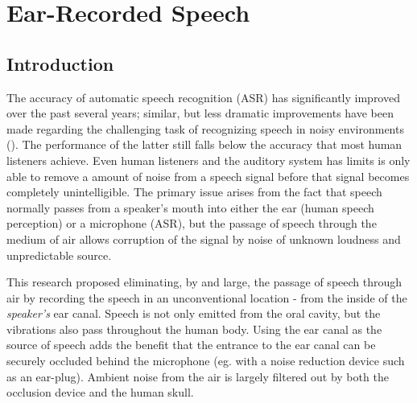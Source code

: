 % 
% 
% 



\chapter{Ear-Recorded Speech\label{chapter2}}


\section{Introduction}

The accuracy of automatic speech recognition (ASR) has significantly improved over the past several years; similar, but less dramatic improvements have been made regarding the challenging task of recognizing speech in noisy environments (\cite{zhang:17}).  The performance of the latter still falls below the accuracy that most human listeners achieve.  Even human listeners and the \DIFaddbegin {}\DIFaddend auditory system has limits \DIFaddbegin {}\DIFaddend is only able to remove a \DIFdelbegin {}\DIFdelend \DIFaddbegin {}\DIFaddend amount of noise from a speech signal before that signal becomes completely unintelligible.  The primary issue arises from the fact that speech normally passes from a speaker's mouth into either the ear (human speech perception) or a microphone (ASR), but the passage of speech through the medium of air allows corruption of the signal by noise of unknown loudness and unpredictable source.  

This research proposed eliminating, by and large, the passage of speech through air by recording the speech in an unconventional location - from the inside of the \textit{speaker's} ear canal.  Speech is not only emitted from the oral cavity, but the vibrations also pass throughout the human body.  Using the ear canal as the source of speech adds the benefit that the entrance to the ear canal can be securely occluded behind the microphone (eg. with a noise reduction device such as an ear-plug).  Ambient noise from the air is largely filtered out by both the occlusion device and the human skull.

